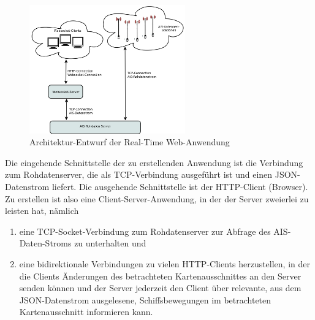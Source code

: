 \begin{figure}
  \begin{center}
    \includegraphics[width=0.6\textwidth]{images/Exposee_graphik_Realtimeapp}
  \end{center}
  \caption{Architektur-Entwurf der Real-Time Web-Anwendung}
\end{figure}
Die eingehende Schnittstelle der zu erstellenden Anwendung ist die Verbindung zum Rohdatenserver, die als TCP-Verbindung ausgeführt ist und einen JSON-Datenstrom liefert.
Die ausgehende Schnittstelle ist der HTTP-Client (Browser).
Zu erstellen ist also eine Client-Server-Anwendung, in der der Server zweierlei zu leisten hat, nämlich 
\begin{enumerate}
 \item eine TCP-Socket-Verbindung zum Rohdatenserver zur Abfrage des AIS-Daten-Stroms zu unterhalten und
  \item eine bidirektionale Verbindungen zu vielen HTTP-Clients herzustellen, in der die Clients Änderungen des betrachteten Kartenausschnittes an den Server senden können und der Server jederzeit den Client über relevante, aus dem JSON-Datenstrom ausgelesene, Schiffsbewegungen im betrachteten Kartenausschnitt informieren kann.
\end{enumerate}








